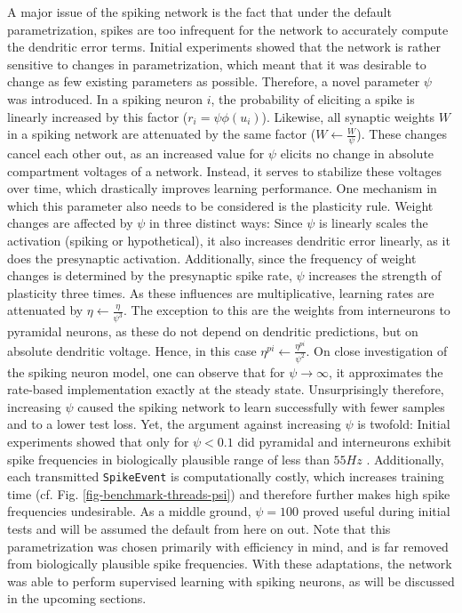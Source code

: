 A major issue of the spiking network is the fact that under the default parametrization, spikes are too infrequent for
the network to accurately compute the dendritic error terms. Initial experiments showed that the network is rather
sensitive to changes in parametrization, which meant that it was desirable to change as few existing parameters as
possible. Therefore, a novel parameter $\psi$ was introduced. In a spiking neuron $i$, the probability of eliciting a
spike is linearly increased by this factor ($r_i = \psi \phi(u_i)$). Likewise, all synaptic weights $W$ in a spiking
network are attenuated by the same factor ($W \leftarrow \frac{W}{\psi}$). These changes cancel each other out, as an
increased value for $\psi$ elicits no change in absolute compartment voltages of a network. Instead, it serves to
stabilize these voltages over time, which drastically improves learning performance. One mechanism in which this
parameter also needs to be considered is the plasticity rule. Weight changes are affected by $\psi$ in three distinct
ways: Since $\psi$ is linearly scales the activation (spiking or hypothetical), it also increases dendritic error
linearly, as it does the presynaptic activation. Additionally, since the frequency of weight changes is determined by
the presynaptic spike rate, $\psi$ increases the strength of plasticity three times. As these influences are
multiplicative, learning rates are attenuated by $\eta \leftarrow \frac{\eta}{\psi^3}$. The exception to this are the
weights from interneurons to pyramidal neurons, as these do not depend on dendritic predictions, but on absolute
dendritic voltage. Hence, in this case $\eta^{pi} \leftarrow\frac{\eta^{pi}}{\psi^2}$. On close investigation of the
spiking neuron model, one can observe that for $\psi \rightarrow \infty$, it approximates the rate-based implementation
exactly at the steady state. Unsurprisingly therefore, increasing $\psi$ caused the spiking network to learn
successfully with fewer samples and to a lower test loss. Yet, the argument against increasing $\psi$ is twofold:
Initial experiments showed that only for $\psi < 0.1$ did pyramidal and interneurons exhibit spike frequencies in
biologically plausible range of less than $55Hz$ \citep{Kawaguchi2001,Eyal2018}. Additionally, each transmitted
\texttt{SpikeEvent} is computationally costly, which increases training time (cf. Fig. \ref{fig-benchmark-threads-psi})
and therefore further makes high spike frequencies undesirable. As a middle ground, $\psi = 100$ proved useful during
initial tests and will be assumed the default from here on out. Note that this parametrization was chosen primarily with
efficiency in mind, and is far removed from biologically plausible spike frequencies. With these adaptations, the
network was able to perform supervised learning with spiking neurons, as will be discussed in the upcoming sections.

